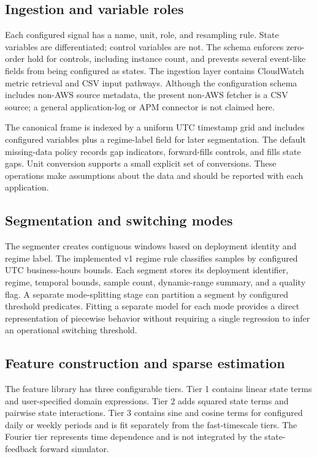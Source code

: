 \documentclass[11pt]{article}
\begin{document}
\subsection{Ingestion and variable roles}

Each configured signal has a name, unit, role, and resampling rule. State variables are differentiated; control variables are not. The schema enforces zero-order hold for controls, including instance count, and prevents several event-like fields from being configured as states. The ingestion layer contains CloudWatch metric retrieval and CSV input pathways. Although the configuration schema includes non-AWS source metadata, the present non-AWS fetcher is a CSV source; a general application-log or APM connector is not claimed here.

The canonical frame is indexed by a uniform UTC timestamp grid and includes configured variables plus a regime-label field for later segmentation. The default missing-data policy records gap indicators, forward-fills controls, and fills state gaps. Unit conversion supports a small explicit set of conversions. These operations make assumptions about the data and should be reported with each application.

\subsection{Segmentation and switching modes}

The segmenter creates contiguous windows based on deployment identity and regime label. The implemented v1 regime rule classifies samples by configured UTC business-hours bounds. Each segment stores its deployment identifier, regime, temporal bounds, sample count, dynamic-range summary, and a quality flag. A separate mode-splitting stage can partition a segment by configured threshold predicates. Fitting a separate model for each mode provides a direct representation of piecewise behavior without requiring a single regression to infer an operational switching threshold.

\subsection{Feature construction and sparse estimation}

The feature library has three configurable tiers. Tier 1 contains linear state terms and user-specified domain expressions. Tier 2 adds squared state terms and pairwise state interactions. Tier 3 contains sine and cosine terms for configured daily or weekly periods and is fit separately from the fast-timescale tiers. The Fourier tier represents time dependence and is not integrated by the state-feedback forward simulator.
\end{document}
